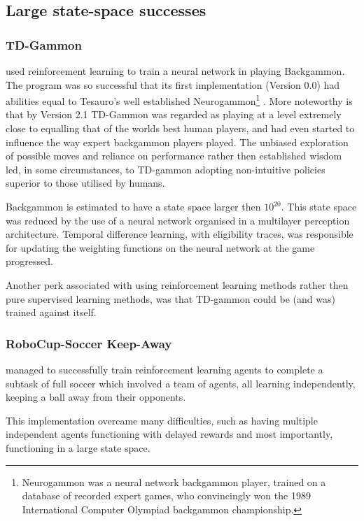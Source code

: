 \documentclass{rucsthesis}
\begin{document}
\subsection{Large state-space successes}

\subsubsection{TD-Gammon}

 \cite{tdgammon} used reinforcement learning to train a neural network in playing Backgammon. The program was so successful that its first implementation (Version 0.0) had abilities equal to Tesauro's well established Neurogammon\footnote{Neurogammon was a neural network backgammon player, trained on a database of recorded expert games, who convincingly won the 1989 International Computer Olympiad backgammon championship.} \citep{tdgammon}.  More noteworthy is that by Version 2.1 TD-Gammon was regarded as playing at a level extremely close to equalling that of the worlds best human players, and had even started to influence the way expert backgammon players played\citep{tdgammon}. The unbiased exploration of possible moves and reliance on performance rather then established wisdom led, in some circumstances, to TD-gammon adopting non-intuitive policies superior to those utilised by humans\citep{tdgammon}.

Backgammon is estimated to have a state space larger then $10^{20}$. This state space was reduced by the use of a neural network organised in a multilayer perception architecture. Temporal difference learning, with eligibility traces, was responsible for updating the weighting functions on the neural network at the game progressed. 

Another perk associated with using reinforcement learning methods rather then pure supervised learning methods, was that TD-gammon could be (and was) trained against itself\citep{tdgammon}.

\subsubsection{RoboCup-Soccer Keep-Away}

\cite{keepaway} managed to successfully train reinforcement learning agents to complete a subtask of full soccer which involved a team of agents, all learning independently, keeping a ball away from their opponents. 

This implementation overcame many difficulties, such as having multiple independent agents functioning with delayed rewards and most importantly, functioning in a large state space. 
\end{document}

